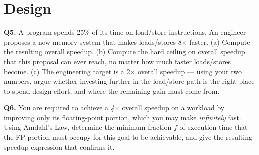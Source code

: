 \documentclass[11pt]{article}
\begin{document}
\section{Design}

\textbf{Q5.} A program spends 25\% of its time on load/store instructions. An engineer proposes a new memory system that makes loads/stores 8$\times$ faster. (a) Compute the resulting overall speedup. (b) Compute the hard ceiling on overall speedup that this proposal can ever reach, no matter how much faster loads/stores become. (c) The engineering target is a 2$\times$ overall speedup --- using your two numbers, argue whether investing further in the load/store path is the right place to spend design effort, and where the remaining gain must come from.

\textbf{Q6.} You are required to achieve a \emph{4$\times$} overall speedup on a workload by improving only its floating-point portion, which you may make \emph{infinitely} fast. Using Amdahl's Law, determine the minimum fraction $f$ of execution time that the FP portion must occupy for this goal to be achievable, and give the resulting speedup expression that confirms it.
\end{document}
